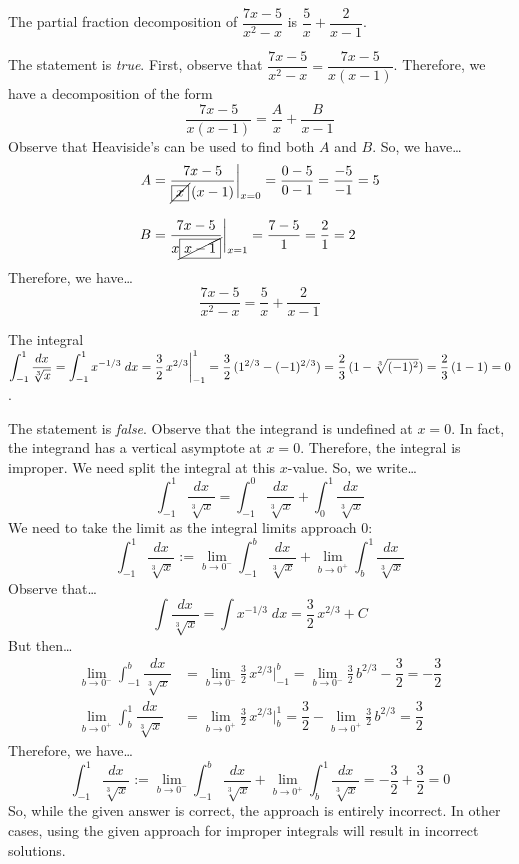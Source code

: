 \documentclass[11pt,letterpaper]{article}
\begin{document}
 The partial fraction decomposition of $\dfrac{7x - 5}{x^2 - x}$ \;is\; $\dfrac{5}{x} + \dfrac{2}{x - 1}$. \pspace

\sol The statement is \textit{true}. First, observe that $\dfrac{7x - 5}{x^2 - x}= \dfrac{7x - 5}{x(x - 1)}$. Therefore, we have a decomposition of the form
	\[
	\dfrac{7x - 5}{x(x - 1)}= \dfrac{A}{x} + \dfrac{B}{x - 1}
	\]
Observe that Heaviside's can be used to find both $A$ and $B$. So, we have\dots
	\[
	\begin{aligned}
	A&= \dfrac{7x - 5}{\cancel{\boxed{x}}\, (x - 1)} \bigg|_{x= 0}= \dfrac{0 - 5}{0 -1}= \dfrac{-5}{-1}= 5 \\[0.3cm]
	B&= \dfrac{7x - 5}{x \cancel{\boxed{x - 1}}} \bigg|_{x= 1}= \dfrac{7 - 5}{1}= \dfrac{2}{1}= 2
	\end{aligned}
	\]
Therefore, we have\dots
	\[
	\dfrac{7x - 5}{x^2 - x}= \dfrac{5}{x} + \dfrac{2}{x - 1}
	\] \pvspace{1.3cm}



 The integral $\displaystyle\int_{-1}^1 \dfrac{dx}{\sqrt[3]{x}}= \int_{-1}^1 x^{-1/3} \;dx= \frac{3}{2} \, x^{2/3} \bigg|_{-1}^1= \frac{3}{2} \, (1^{2/3} - (-1)^{2/3})= \frac{2}{3} \, (1 - \sqrt[3]{(-1)^2})= \frac{2}{3} \, (1 - 1)= 0$. \pspace

\sol The statement is \textit{false}. Observe that the integrand is undefined at $x= 0$. In fact, the integrand has a vertical asymptote at $x= 0$. Therefore, the integral is improper. We need split the integral at this $x$-value. So, we write\dots
	\[
	\int_{-1}^1 \dfrac{dx}{\sqrt[3]{x}}= \int_{-1}^0 \dfrac{dx}{\sqrt[3]{x}} + \int_0^1 \dfrac{dx}{\sqrt[3]{x}}
	\]
We need to take the limit as the integral limits approach $0$:
	\[
	\int_{-1}^1 \dfrac{dx}{\sqrt[3]{x}}:= \lim_{b \to 0^-} \int_{-1}^b \dfrac{dx}{\sqrt[3]{x}} + \lim_{b \to 0^+} \int_b^1 \dfrac{dx}{\sqrt[3]{x}}
	\]
Observe that\dots
	\[
	\int \dfrac{dx}{\sqrt[3]{x}}= \int x^{-1/3} \;dx= \frac{3}{2}\,x^{2/3} + C
	\]
But then\dots
	\[
	\begin{aligned}
	\lim_{b \to 0^-} \int_{-1}^b \dfrac{dx}{\sqrt[3]{x}}&= \lim_{b \to 0^-} \frac{3}{2}\,x^{2/3} \bigg|_{-1}^b= \lim_{b \to 0^-} \frac{3}{2}\,b^{2/3} - \dfrac{3}{2}= -\dfrac{3}{2} \\[0.3cm]
	\lim_{b \to 0^+} \int_b^1 \dfrac{dx}{\sqrt[3]{x}}&= \lim_{b \to 0^+} \frac{3}{2}\,x^{2/3} \bigg|_b^1= \dfrac{3}{2} - \lim_{b \to 0^+} \frac{3}{2}\,b^{2/3}= \dfrac{3}{2}
	\end{aligned}
	\]
Therefore, we have\dots
	\[
	\int_{-1}^1 \dfrac{dx}{\sqrt[3]{x}}:= \lim_{b \to 0^-} \int_{-1}^b \dfrac{dx}{\sqrt[3]{x}} + \lim_{b \to 0^+} \int_b^1 \dfrac{dx}{\sqrt[3]{x}}= -\dfrac{3}{2} + \dfrac{3}{2}= 0
	\]
So, while the given answer is correct, the approach is entirely incorrect. In other cases, using the given approach for improper integrals will result in incorrect solutions. \pvspace{1.3cm} 
\end{document}
